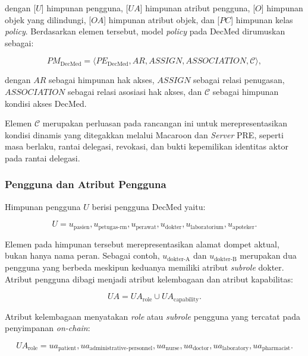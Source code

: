 \documentclass[bahasa, 12pt, a4paper, onecolumn, oneside, final]{report}
\begin{document}
dengan [$U$] himpunan pengguna, [$UA$] himpunan atribut pengguna, [$O$] himpunan objek yang dilindungi, [$OA$] himpunan atribut objek, dan [$PC$] himpunan kelas \textit{policy}. Berdasarkan elemen tersebut, model \textit{policy} pada DecMed dirumuskan sebagai:

\begin{equation}
	PM_{\text{DecMed}}
	=
	\langle
	PE_{\text{DecMed}},
	AR,
	ASSIGN,
	ASSOCIATION,
	\mathcal{C}
	\rangle,
\end{equation}

dengan $AR$ sebagai himpunan hak akses, $ASSIGN$ sebagai relasi penugasan, $ASSOCIATION$ sebagai relasi asosiasi hak akses, dan $\mathcal{C}$ sebagai himpunan kondisi akses DecMed.

Elemen $\mathcal{C}$ merupakan perluasan pada rancangan ini untuk merepresentasikan kondisi dinamis yang ditegakkan melalui Macaroon dan \textit{Server} PRE, seperti masa berlaku, rantai delegasi, revokasi, dan bukti kepemilikan identitas aktor pada rantai delegasi.

\subsubsection{Pengguna dan Atribut Pengguna}

Himpunan pengguna $U$ berisi pengguna DecMed yaitu:

\begin{equation}
	U =
	{
	u_{\text{pasien}},
	u_{\text{petugas-rm}},
	u_{\text{perawat}},
	u_{\text{dokter}},
	u_{\text{laboratorium}},
	u_{\text{apoteker}}
	}.
\end{equation}

Elemen pada himpunan tersebut merepresentasikan alamat dompet aktual, bukan hanya nama peran. Sebagai contoh, $u_{\text{dokter-A}}$ dan $u_{\text{dokter-B}}$ merupakan dua pengguna yang berbeda meskipun keduanya memiliki atribut \textit{subrole} dokter. Atribut pengguna dibagi menjadi atribut kelembagaan dan atribut kapabilitas:

\begin{equation}
	UA = UA_{\text{role}} \cup UA_{\text{capability}}.
\end{equation}

Atribut kelembagaan menyatakan \textit{role} atau \textit{subrole} pengguna yang tercatat pada penyimpanan \textit{on-chain}:

\begin{equation}
	UA_{\text{role}} =
		{
			ua_{\text{patient}},
			ua_{\text{administrative-personnel}},
			ua_{\text{nurse}},
			ua_{\text{doctor}},
			ua_{\text{laboratory}},
			ua_{\text{pharmacist}}
		}.
\end{equation}
\end{document}
